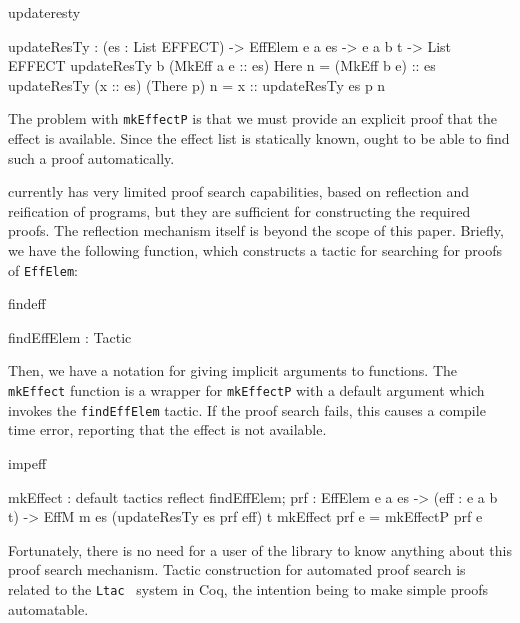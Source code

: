 \begin{SaveVerbatim}{updateresty}

updateResTy : (es : List EFFECT) -> 
              EffElem e a es -> e a b t -> List EFFECT
updateResTy {b} (MkEff a e :: es) Here n 
    = (MkEff b e) :: es
updateResTy (x :: es) (There p) n 
    = x :: updateResTy es p n

\end{SaveVerbatim}

\noindent
The problem with \texttt{mkEffectP} is that we must provide an 
explicit proof that the effect is available. Since the effect list is statically
known, \Idris{} ought to be able to find such a proof automatically.

\Idris{} currently has very limited proof search capabilities, based on
reflection and reification of \Idris{} programs, but they
are sufficient for constructing the required proofs. The reflection mechanism
itself is beyond the scope of this paper. Briefly, we have
the following function, which constructs a tactic for searching for proofs 
of \texttt{EffElem}:

\begin{SaveVerbatim}{findeff}

findEffElem : Tactic 

\end{SaveVerbatim}

\noindent
Then, we have a notation for giving  implicit arguments to
functions. The \texttt{mkEffect} function is a wrapper for \texttt{mkEffectP}
with a default argument which invokes the \texttt{findEffElem} tactic. If
the proof search fails, this causes a compile time error, reporting that the
effect is not available.

\label{sect:mkeffect}
\begin{SaveVerbatim}{impeff}

mkEffect : {default tactics { reflect findEffElem; } 
              prf : EffElem e a es} -> 
           (eff : e a b t) -> 
           EffM m es (updateResTy es prf eff) t
mkEffect {prf} e = mkEffectP prf e

\end{SaveVerbatim}

\noindent
Fortunately, there is no need for a user of the library to know anything about
this proof search mechanism. Tactic construction for automated proof search is
related to the \texttt{Ltac}~\cite{Delahaye2000} system in Coq, the intention
being to make simple proofs automatable.

